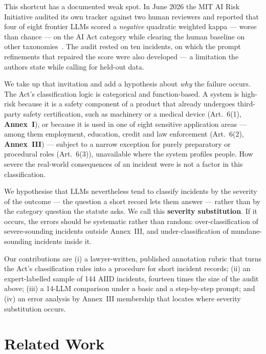 \documentclass[sigconf,natbib=false, language=english]{acmart}
\begin{document}
This shortcut has a documented weak spot. In June 2026 the MIT AI Risk Initiative
audited its own tracker against two human reviewers and reported that four of eight
frontier LLMs scored a \emph{negative} quadratic weighted kappa --- worse than chance
--- on the AI Act category while clearing the human baseline on other
taxonomies~\cite{mit_tracker_2026}. The audit rested on ten incidents, on which the
prompt refinements that repaired the score were also developed --- a limitation the
authors state while calling for held-out data.

We take up that invitation and add a hypothesis about \emph{why} the failure occurs.
The Act's classification logic is categorical and function-based. A system is
high-risk because it is a safety component of a product
that already undergoes third-party safety certification, such as machinery or a
medical device (Art.~6(1), \textbf{Annex~I}), or because it is used in one of eight
sensitive application areas --- among them employment, education, credit and law
enforcement (Art.~6(2), \textbf{Annex~III}) --- subject to a narrow exception for
purely preparatory or procedural roles (Art.~6(3)), unavailable where the system
profiles people. How severe the real-world consequences of an incident were is not a
factor in this classification.

We hypothesise that LLMs nevertheless tend to classify incidents by the severity of
the outcome --- the question a short record lets them answer --- rather than by the
category question the statute asks. We call this \textbf{severity substitution}. If
it occurs, the errors should be systematic rather than random: over-classification of
severe-sounding incidents outside Annex~III, and under-classification of
mundane-sounding incidents inside it.

Our contributions are (i) a lawyer-written, published annotation rubric that turns
the Act's classification rules into a procedure for short incident records; (ii) an
expert-labelled sample of 144 AIID incidents, fourteen times the size of the audit
above; (iii) a 14-LLM comparison under a basic and a step-by-step prompt; and (iv) an
error analysis by Annex~III membership that locates where severity substitution
occurs.

\section{Related Work}
\end{document}
